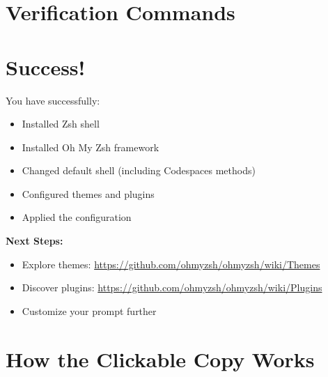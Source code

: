 \documentclass{article}
\begin{document}
\section{Verification Commands}



\section{Success!}

\begin{successbox}
You have successfully:
\begin{itemize}
    \item Installed Zsh shell
    \item Installed Oh My Zsh framework  
    \item Changed default shell (including Codespaces methods)
    \item Configured themes and plugins
    \item Applied the configuration
\end{itemize}

\textbf{Next Steps:}
\begin{itemize}
    \item Explore themes: \url{https://github.com/ohmyzsh/ohmyzsh/wiki/Themes}
    \item Discover plugins: \url{https://github.com/ohmyzsh/ohmyzsh/wiki/Plugins}
    \item Customize your prompt further
\end{itemize}
\end{successbox}

\section{How the Clickable Copy Works}
\end{document}
